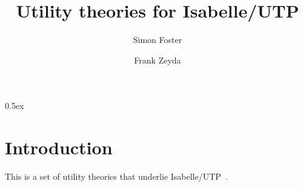 \documentclass[11pt,a4paper]{article}
\begin{document}
\title{Utility theories for Isabelle/UTP}

\author{Simon Foster \and Frank Zeyda}

\maketitle

\tableofcontents

\parindent 0pt\parskip 0.5ex

\section{Introduction}

This is a set of utility theories that underlie Isabelle/UTP~\cite{Foster14,Foster16a}.















































\end{document}
